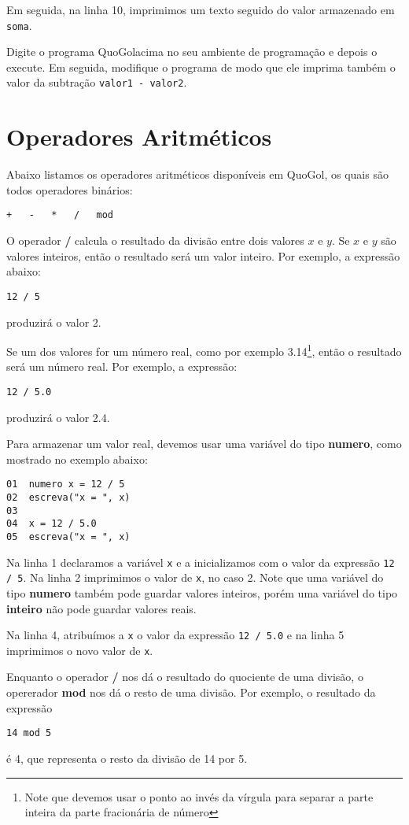 \documentclass{report}
\newcommand{\Qgol}{QuoGol\;}
\begin{document}
Em seguida, na linha 10, imprimimos um texto seguido do valor armazenado
em \texttt{soma}. 

Digite o programa \Qgol acima no seu ambiente de programação
e depois o execute. Em seguida, modifique o programa de modo que
ele imprima também o valor da subtração \texttt{valor1 - valor2}.



\section{Operadores Aritméticos}

Abaixo listamos os operadores aritméticos disponíveis em \Qgol,
os quais são todos operadores binários:
\begin{verbatim}
+   -   *   /   mod
\end{verbatim}


O operador \textbf{/} calcula o resultado da divisão entre dois valores
$x$ e $y$. Se $x$ e $y$ são valores inteiros, então o resultado será um
valor inteiro. Por exemplo, a expressão abaixo:
\begin{verbatim}
12 / 5
\end{verbatim}
produzirá o valor 2.

Se um dos valores for um número real, como por exemplo 3.14\footnote{Note que devemos
usar o ponto ao invés da vírgula para separar a parte inteira da parte fracionária de número},
então o resultado será um número real. Por exemplo, a expressão:
\begin{verbatim}
12 / 5.0
\end{verbatim}
produzirá o valor 2.4.

Para armazenar um valor real, devemos usar uma variável do tipo
\textbf{numero}, como mostrado no exemplo abaixo:
\begin{verbatim}
01  numero x = 12 / 5
02  escreva("x = ", x)
03
04  x = 12 / 5.0
05  escreva("x = ", x)
\end{verbatim}
%
Na linha 1 declaramos a variável \texttt{x} e a inicializamos
com o valor da expressão \texttt{12 / 5}. Na linha 2 imprimimos
o valor de \texttt{x}, no caso 2. Note que uma variável do tipo
\textbf{numero} também pode guardar valores inteiros, porém uma
variável do tipo \textbf{inteiro} não pode guardar valores reais.

Na linha 4, atribuímos a \texttt{x} o valor da expressão \texttt{12 / 5.0}
e na linha 5 imprimimos o novo valor de \texttt{x}.

Enquanto o operador \textbf{/} nos dá o resultado do quociente
de uma divisão, o opererador \textbf{mod} nos dá o resto de uma
divisão. Por exemplo, o resultado da expressão
\begin{verbatim}
14 mod 5
\end{verbatim}
é 4, que representa o resto da divisão de 14 por 5.
\end{document}
